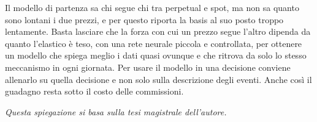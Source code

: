 \documentclass[a4paper,11pt]{article}
\begin{document}
Il modello di partenza sa chi segue chi tra perpetual e spot, ma non sa quanto sono lontani i due prezzi, e per questo riporta la basis al suo posto troppo lentamente. Basta lasciare che la forza con cui un prezzo segue l'altro dipenda da quanto l'elastico è teso, con una rete neurale piccola e controllata, per ottenere un modello che spiega meglio i dati quasi ovunque e che ritrova da solo lo stesso meccanismo in ogni giornata. Per usare il modello in una decisione conviene allenarlo su quella decisione e non solo sulla descrizione degli eventi. Anche così il guadagno resta sotto il costo delle commissioni.

\vspace{1em}
\noindent\textit{Questa spiegazione si basa sulla tesi magistrale dell'autore.}
\end{document}
